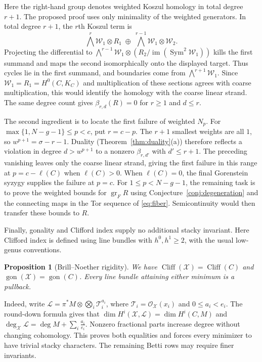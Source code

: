 \documentclass[11pt,reqno]{amsart}
\newtheorem{prop}[lemma]{Proposition}
\theoremstyle{remark}
\newcommand{\Sym}{\operatorname{Sym}} %
\newcommand{\gon}{\operatorname{gon}}
\newcommand{\cliff}{\operatorname{Cliff}}
\newcommand{\cL}{\mathcal{L}}
\newcommand{\cO}{\mathcal{O}}
\newcommand{\cT}{\mathcal{T}}
\newcommand{\cW}{\mathcal{W}}
\newcommand{\cX}{\mathcal{X}}
\begin{document}
Here the right-hand group denotes weighted Koszul homology in total degree $r+1$. The proposed proof uses only minimality of the weighted generators. In total degree $r+1$, the $r$th Koszul term is
\[
\bigwedge^r\cW_1\otimes R_1
\;\oplus\;
\bigwedge^{r-1}\cW_1\otimes\cW_2.
\]
Projecting the differential to
$\bigwedge^{r-1}\cW_1\otimes(R_2/\operatorname{im}(\Sym^2\cW_1))$
kills the first summand and maps the second isomorphically onto the displayed target. Thus cycles lie in the first summand, and boundaries come from $\bigwedge^{r+1}\cW_1$. Since $\cW_1=R_1=H^0(C,K_C)$ and multiplication of these sections agrees with coarse multiplication, this would identify the homology with the coarse linear strand. The same degree count gives $\beta_{r,d}(R)=0$ for $r\geq1$ and $d\leq r$.

The second ingredient is to locate the first failure of weighted $N_p$. For $\max\{1,N-g-1\}\leq p<c$, put $r=c-p$. The $r+1$ smallest weights are all $1$, so $w^{p+1}=\sigma-r-1$. Duality (Theorem~\ref{thm:duality}(a)) therefore reflects a violation in degree $d>w^{p+1}$ to a nonzero $\beta_{r,d'}$ with $d'\leq r+1$. The preceding vanishing leaves only the coarse linear strand, giving the first failure in this range at $p=c-\ell(C)$ when $\ell(C)>0$. When $\ell(C)=0$, the final Gorenstein syzygy supplies the failure at $p=c$. For $1\leq p<N-g-1$, the remaining task is to prove the weighted bounds for $\operatorname{gr}_F R$ using Conjecture~\ref{conj:degeneration} and the connecting maps in the Tor sequence of \eqref{eq:fiber}. Semicontinuity would then transfer these bounds to $R$.

Finally, gonality and Clifford index supply no additional stacky invariant. Here Clifford index is defined using line bundles with $h^0,h^1\geq2$, with the usual low-genus conventions.

\begin{prop}[Brill--Noether rigidity]\label{prop:bn-rigidity}
We have $\cliff(\cX)=\cliff(C)$ and $\gon(\cX)=\gon(C)$. Every line bundle attaining either minimum is a pullback.
\end{prop}

Indeed, write $\cL=\pi^*M\otimes\bigotimes_i\cT_i^{a_i}$, where $\cT_i=\cO_{\cX}(x_i)$ and $0\leq a_i<e_i$. The round-down formula gives that $\dim H^i(\cX,\cL)=\dim H^i(C,M)$ and $\deg_{\cX}\cL=\deg M+\sum_i\frac{a_i}{e_i}$. Nonzero fractional parts increase degree without changing cohomology. This proves both equalities and forces every minimizer to have trivial stacky characters. The remaining Betti rows may require finer invariants.
\end{document}
